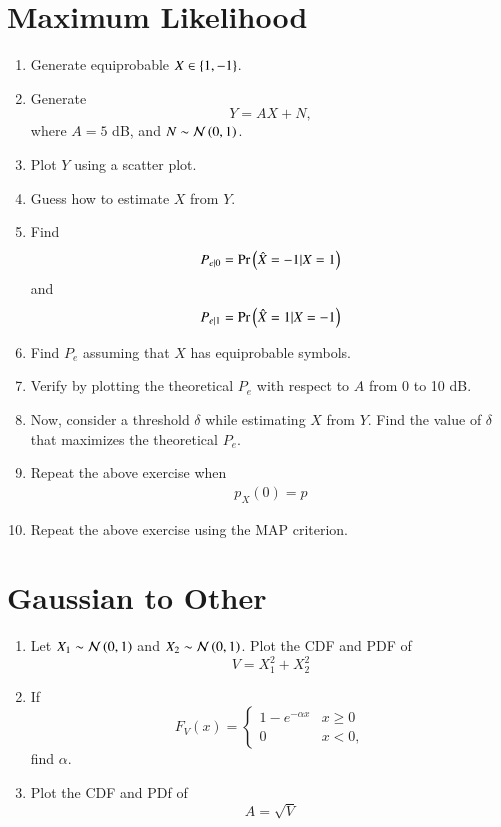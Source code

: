 \documentclass[journal,12pt,twocolumn]{IEEEtran}
\renewcommand\thesection{\arabic{section}}
\begin{document}
\begin{enumerate}[label=\thesection.\arabic*,ref=\thesection.\theenumi]
\section{Maximum Likelihood}
\begin{enumerate}[label=\thesection.\arabic*
,ref=\thesection.\theenumi]
\item Generate equiprobable $X \in \left\{1,-1\right\}$.
\item Generate
\begin{equation}
Y = AX+N,
\end{equation}
		where $A = 5$ dB,  and $N \sim \mathcal{N}\left(0,1\right)$.
	\item Plot $Y$ using a scatter plot.
	\item Guess how to estimate $X$ from $Y$.
\item
\label{ml-ch4_sim}
Find
\begin{equation}
	P_{e|0} = \Pr\left(\hat{X} = -1|X=1\right)
\end{equation}
and
\begin{equation}
	P_{e|1} = \Pr\left(\hat{X} = 1|X=-1\right)
\end{equation}
%
\item Find $P_e$ assuming that $X$ has equiprobable symbols.
%
\item
Verify by plotting  the theoretical $P_e$ with respect to $A$ from 0 to 10 dB.
%
\item Now, consider a threshold $\delta$  while estimating $X$ from $Y$. Find the value of $\delta$ that maximizes the theoretical $P_e$.
\item Repeat the above exercise when
	\begin{align}
		p_{X}(0) = p
	\end{align}
\item Repeat the above exercise using the MAP criterion.
		\end{enumerate}
\section{Gaussian to Other}
\begin{enumerate}[label=\thesection.\arabic*
,ref=\thesection.\theenumi]
\item
Let $X_1 \sim  \mathcal{N}\left(0,1\right)$ and $X_2 \sim  \mathcal{N}\left(0,1\right)$. Plot the CDF and PDF of
%
\begin{equation}
V = X_1^2 + X_2^2
\end{equation}
%
%
%
\item
If
%
\begin{equation}
F_{V}(x) =
\begin{cases}
1 - e^{-\alpha x} & x \geq 0 \\
0 & x < 0,
\end{cases}
\end{equation}
%
find $\alpha$.
%
\item
\label{ch3_raleigh_sim}
Plot the CDF and PDf of
%
\begin{equation}
A = \sqrt{V}
\end{equation}
%
\end{enumerate}

\end{enumerate}
\end{document}
